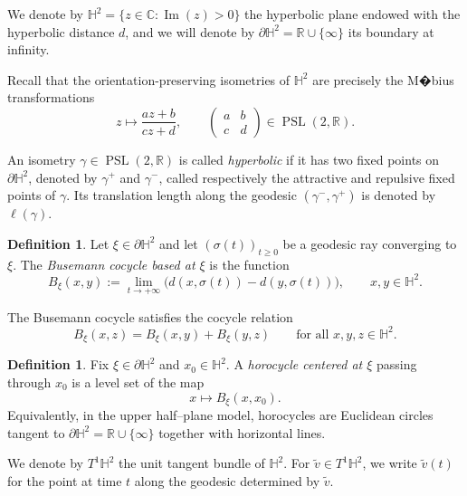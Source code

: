 \documentclass[a4paper,english,reqno]{amsart}
\theoremstyle{definition}
\newtheorem{definition}[theorem]{Definition}
\numberwithin{equation}{section}
\begin{document}
We denote by $\mathbb H^2=\{z\in\mathbb{C}:\operatorname{Im} (z)>0\}$ the hyperbolic plane endowed with the hyperbolic distance $d$, and we will denote by $
\partial \mathbb H^2=\mathbb R\cup\{\infty\}
$
 its boundary at infinity.


Recall that the orientation-preserving isometries of $\mathbb H^2$ are precisely the
M�bius transformations
\[
z\longmapsto \frac{az+b}{cz+d},
\qquad
\begin{pmatrix}
	a&b\\ c&d
\end{pmatrix}\in \operatorname{PSL}(2,\mathbb R).
\]

An isometry $\gamma\in \operatorname{PSL}(2,\mathbb R)$ is called \emph{hyperbolic} if it has two fixed
points on $\partial\mathbb H^2$, denoted by $\gamma^+$ and $\gamma^-$, called respectively
the attractive and repulsive fixed points of $\gamma$. Its translation length along the geodesic $(\gamma^-,\gamma^+)$ is denoted
by $\ell(\gamma)$.

\begin{definition}
	Let $\xi\in\partial\mathbb H^2$ and let $(\sigma(t))_{t\ge 0}$ be a geodesic ray
	converging to $\xi$. The \emph{Busemann cocycle based at $\xi$} is the function
	\[
	B_\xi(x,y):=\lim\limits_{t\to+\infty}\bigl(d(x,\sigma(t))-d(y,\sigma(t))\bigr),
	\qquad x,y\in\mathbb H^2.
	\]
\end{definition}

The Busemann cocycle satisfies the cocycle relation
\[
B_\xi(x,z)=B_\xi(x,y)+B_\xi(y,z)
\qquad \text{for all } x,y,z\in \mathbb H^2.
\]

\begin{definition}
	Fix $\xi\in\partial\mathbb H^2$ and $x_0\in\mathbb H^2$. A \emph{horocycle centered at $\xi$} passing through $x_0$
	is a level set of the map
	\[
	x\longmapsto B_\xi(x,x_0).
	\]
	Equivalently, in the upper half--plane model, horocycles are Euclidean circles tangent
	to $\partial\mathbb H^2=\mathbb R\cup\{\infty\}$ together with horizontal lines.
\end{definition}

We denote by $T^1\mathbb H^2$ the unit tangent bundle of $\mathbb H^2$.
For $\tilde v\in T^1\mathbb H^2$, we write $\tilde v(t)$ for the point at time $t$
along the geodesic determined by $\tilde v$.


\end{document}
